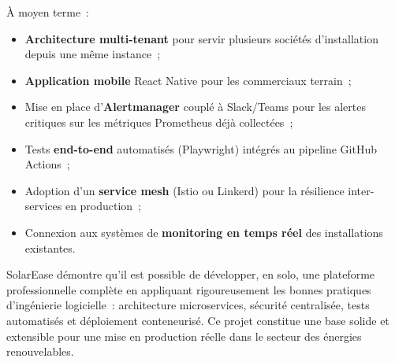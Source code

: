 À moyen terme~:
\begin{itemize}
  \item \textbf{Architecture multi-tenant} pour servir plusieurs sociétés
    d'installation depuis une même instance~;
  \item \textbf{Application mobile} React Native pour les commerciaux terrain~;
  \item Mise en place d'\textbf{Alertmanager} couplé à Slack/Teams pour les
    alertes critiques sur les métriques Prometheus déjà collectées~;
  \item Tests \textbf{end-to-end} automatisés (Playwright) intégrés au
    pipeline GitHub Actions~;
  \item Adoption d'un \textbf{service mesh} (Istio ou Linkerd) pour la
    résilience inter-services en production~;
  \item Connexion aux systèmes de \textbf{monitoring en temps réel} des
    installations existantes.
\end{itemize}

\vspace{0.8cm}
\begin{center}
  \begin{tcolorbox}[colback=isetblue!8, colframe=isetblue,
      width=0.9\textwidth, halign=center, fontupper=\itshape]
    SolarEase démontre qu'il est possible de développer, en solo, une
    plateforme professionnelle complète en appliquant rigoureusement les
    bonnes pratiques d'ingénierie logicielle~: architecture microservices,
    sécurité centralisée, tests automatisés et déploiement conteneurisé.
    Ce projet constitue une base solide et extensible pour une mise en
    production réelle dans le secteur des énergies renouvelables.
  \end{tcolorbox}
\end{center}

\cleardoublepage
